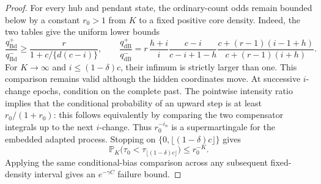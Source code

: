 \documentclass[11pt]{article}
\theoremstyle{definition}
\theoremstyle{remark}
\newcommand{\Bd}{\mathrm{Bd}}
\newcommand{\dB}{\mathrm{dB}}
\newcommand{\Prob}{\mathbb P}
\begin{document}
\begin{proof}
For every hub and pendant state, the ordinary-count odds remain bounded
below by a constant $r_0>1$ from $K$ to a fixed positive core density.
Indeed, the two tables give the uniform lower bounds
\[
 \frac{q^+_{\Bd}}{q^-_{\Bd}}
 \geq\frac{r}{1+c/\{d(c-i)\}},\qquad
 \frac{q^+_{\dB}}{q^-_{\dB}}
 =r\,\frac{h+i}{i}\frac{c-i}{c-i+1-h}
 \frac{c+(r-1)(i-1+h)}{c+(r-1)(i+h)}.
\]
For $K\to\infty$ and $i\leq(1-\delta)c$, their infimum is strictly larger
than one.  This comparison remains valid although the hidden coordinates
move.  At successive $i$-change epochs, condition on the complete past.  The
pointwise intensity ratio implies that the conditional probability of an
upward step is at least $r_0/(1+r_0)$: this follows equivalently by comparing
the two compensator integrals up to the next $i$-change.  Thus
$r_0^{-i_n}$ is a supermartingale for the embedded adapted process.  Stopping
on $\{0,\lfloor(1-\delta)c\rfloor\}$ gives
\[
 \Prob_K\bigl(\tau_0<\tau_{\lfloor(1-\delta)c\rfloor}\bigr)
 \leq r_0^{-K}.
\]
Applying the same conditional-bias comparison across any subsequent
fixed-density interval gives an $e^{-\gamma C}$ failure bound.


\end{proof}
\end{document}

